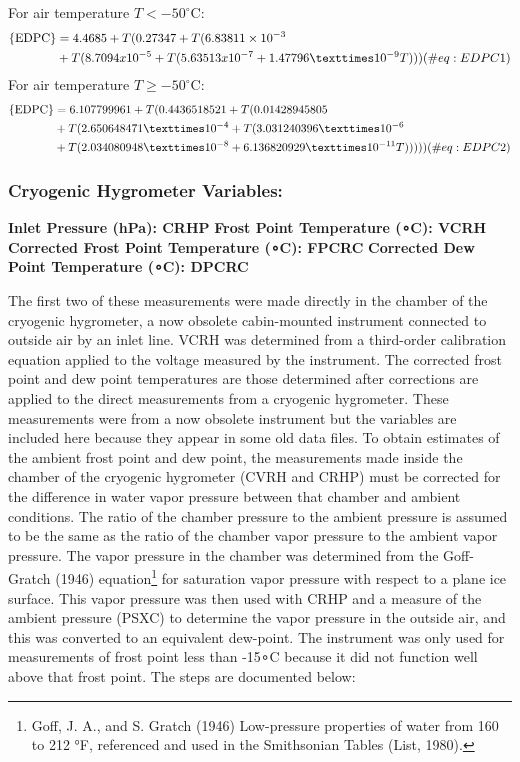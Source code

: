 \documentclass[
  english,
]{book}
\begin{document}
For air temperature \(T < -50^\circ\)C:\\
\begin{align}
\mathrm{\{EDPC\}} &= 4.4685 + T(0.27347 + T (6.83811\times 10^{-3}\notag \\
&+ T(8.7094x10^{-5} + T(5.63513x10^{-7} + 1.47796 × 10^{-9}T)))
(\#eq:EDPC1)
\end{align} For air temperature \(T \ge -50^\circ\)C:\\
\begin{align}
\mathrm{\{EDPC\}} &= 6.107799961 + T(0.4436518521 + T(0.01428945805\notag \\
&+ T(2.650648471 × 10^{-4} + T(3.031240396 × 10^{-6}\notag \\
&+ T (2.034080948 × 10^{-8} + 6.136820929 × 10^{-11}T)))))
(\#eq:EDPC2)
\end{align}

\hypertarget{cryo-hygro}{%
\subsubsection*{Cryogenic Hygrometer Variables:}\label{cryo-hygro}}

\textbf{Inlet Pressure (hPa): CRHP} \textbf{Frost Point Temperature
({∘C}): VCRH} \textbf{Corrected Frost Point Temperature ({∘C}): FPCRC}
\textbf{Corrected Dew Point Temperature ({∘C}): DPCRC}

The first two of these measurements were made directly in the chamber of
the cryogenic hygrometer, a now obsolete cabin-mounted instrument
connected to outside air by an inlet line. VCRH was determined from a
third-order calibration equation applied to the voltage measured by the
instrument. The corrected frost point and dew point temperatures are
those determined after corrections are applied to the direct
measurements from a cryogenic hygrometer. These measurements were from a
now obsolete instrument but the variables are included here because they
appear in some old data files. To obtain estimates of the ambient frost
point and dew point, the measurements made inside the chamber of the
cryogenic hygrometer (CVRH and CRHP) must be corrected for the
difference in water vapor pressure between that chamber and ambient
conditions. The ratio of the chamber pressure to the ambient pressure is
assumed to be the same as the ratio of the chamber vapor pressure to the
ambient vapor pressure. The vapor pressure in the chamber was determined
from the Goff-Gratch (1946) equation\footnote{Goff, J. A., and S. Gratch
  (1946) Low-pressure properties of water from 160 to 212 °F, referenced
  and used in the Smithsonian Tables (List, 1980).} for saturation vapor
pressure with respect to a plane ice surface. This vapor pressure was
then used with CRHP and a measure of the ambient pressure (PSXC) to
determine the vapor pressure in the outside air, and this was converted
to an equivalent dew-point. The instrument was only used for
measurements of frost point less than -15{∘}C because it did not
function well above that frost point. The steps are documented below:
\end{document}
